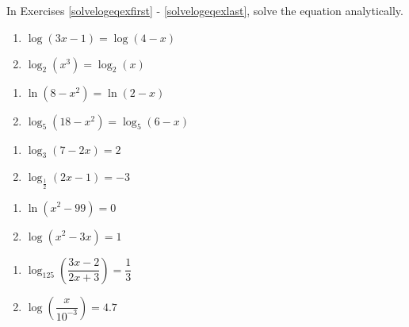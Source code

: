 In Exercises \ref{solvelogeqexfirst} - \ref{solvelogeqexlast}, solve the equation analytically.

\begin{multicols}{2}
\begin{enumerate}

\item $\log(3x-1) = \log(4-x)$  \label{solvelogeqexfirst}

\item $\log_{2}\left(x^{3}\right) = \log_{2}(x)$

\setcounter{HW}{\value{enumi}}
\end{enumerate}
\end{multicols}

\begin{multicols}{2}
\begin{enumerate}
\setcounter{enumi}{\value{HW}}

\item $\ln\left(8-x^2\right)=\ln(2-x)$

\item $\log_{5}\left(18-x^2\right) = \log_{5}(6-x)$

\setcounter{HW}{\value{enumi}}
\end{enumerate}
\end{multicols}

\begin{multicols}{2}
\begin{enumerate}
\setcounter{enumi}{\value{HW}}

\item $\log_{3}(7-2x) = 2$
\item $\log_{\frac{1}{2}} (2x-1) = -3$

\setcounter{HW}{\value{enumi}}
\end{enumerate}
\end{multicols}

\begin{multicols}{2}
\begin{enumerate}
\setcounter{enumi}{\value{HW}}

\item $\ln\left(x^2-99\right) = 0$
\item $\log(x^2-3x) = 1$

\setcounter{HW}{\value{enumi}}
\end{enumerate}
\end{multicols}

\begin{multicols}{2}
\begin{enumerate}
\setcounter{enumi}{\value{HW}}

\item $\log_{125} \left(\dfrac{3x-2}{2x+3}\right)=\dfrac{1}{3}$

\item $\log\left(\dfrac{x}{10^{-3}}\right) = 4.7$  \label{sixfourRichterequ}


\setcounter{HW}{\value{enumi}}
\end{enumerate}
\end{multicols}


